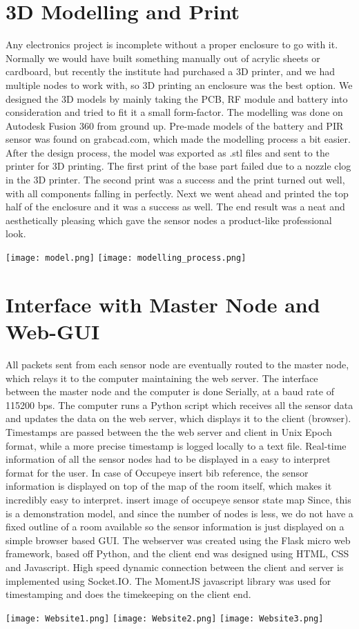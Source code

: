 \section{3D Modelling and Print}
Any electronics project is incomplete without a proper enclosure to go with it. Normally we would have built something manually out of acrylic sheets or cardboard, but recently the institute had purchased a 3D printer, and we had multiple nodes to work with, so 3D printing an enclosure was the best option. 
We designed the 3D models by mainly taking the PCB, RF module and battery into consideration and tried to fit it a small form-factor. The modelling was done on Autodesk Fusion 360 from ground up. Pre-made models of the battery and PIR sensor was found on grabcad.com, which made the modelling process a bit easier.
After the design process, the model was exported as .stl files and sent to the printer for 3D printing. The first print of the base part failed due to a nozzle clog in the 3D printer. The second print was a success and the print turned out well, with all components falling in perfectly. Next we went ahead and printed the top half of the enclosure and it was a success as well.
The end result was a neat and aesthetically pleasing which gave the sensor nodes a product-like professional look.

\texttt{[image: model.png]}
\texttt{[image: modelling\_process.png]}

\section{Interface with Master Node and Web-GUI}
All packets sent from each sensor node are eventually routed to the master node, which relays it to the computer maintaining the web server. The interface between the master node and the computer is done Serially, at a baud rate of 115200 bps. The computer runs a Python script which receives all the sensor data and updates the data on the web server, which displays it to the client (browser). Timestamps are passed between the the web server and client in Unix Epoch format, while a more precise timestamp is logged locally to a text file. 
Real-time information of all the sensor nodes had to be displayed in a easy to interpret format for the user. In case of Occupeye {insert bib reference}, the sensor information is displayed on top of the map of the room itself, which makes it incredibly easy to interpret. 
{insert image of occupeye sensor state map}
Since, this is a demonstration model, and since the number of nodes is less, we do not have a fixed outline of a room available so the sensor information is just displayed on a simple browser based GUI.
The webserver was created using the Flask micro web framework, based off Python, and the client end was designed using HTML, CSS and Javascript. High speed dynamic connection between the client and server is implemented using Socket.IO. The MomentJS javascript library was used for timestamping and does the timekeeping on the client end.


\texttt{[image: Website1.png]}
\texttt{[image: Website2.png]}
\texttt{[image: Website3.png]}